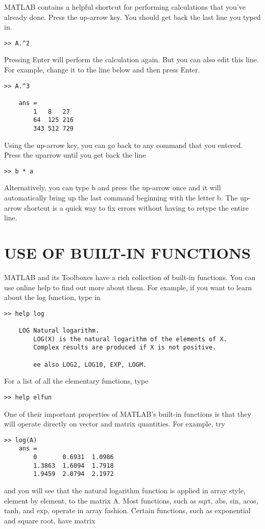 \documentclass[../main.tex]{subfiles}
\begin{document}
MATLAB contains a helpful shortcut for performing calculations that you’ve already
done. Press the up-arrow key. You should get back the last line you typed in.
\begin{lstlisting}[frame=none, numbers=none]
	>> A.^2
\end{lstlisting}
Pressing Enter will perform the calculation again. But you can also edit this line. For
example, change it to the line below and then press Enter.
\begin{lstlisting}[frame=none, numbers=none]
	>> A.^3

	ans =
		1 	8 	27
		64 	125	216
		343	512	729
\end{lstlisting}
Using the up-arrow key, you can go back to any command that you entered. Press the uparrow until you get back the line
\begin{lstlisting}[frame=none, numbers=none]
	>> b * a
\end{lstlisting}
Alternatively, you can type b and press the up-arrow once and it will automatically bring
up the last command beginning with the letter b. The up-arrow shortcut is a quick way to
fix errors without having to retype the entire line.


\section{USE OF BUILT-IN FUNCTIONS}

MATLAB and its Toolboxes have a rich collection of built-in functions. You can use online
help to find out more about them. For example, if you want to learn about the log function,
type in
\begin{lstlisting}[frame=none, numbers=none]
	>> help log

	LOG Natural logarithm.
		LOG(X) is the natural logarithm of the elements of X.
		Complex results are produced if X is not positive.

		ee also LOG2, LOG10, EXP, LOGM.
\end{lstlisting}
For a list of all the elementary functions, type
\begin{lstlisting}[frame=none, numbers=none]
	>> help elfun
\end{lstlisting}
One of their important properties of MATLAB’s built-in functions is that they will operate directly on vector and matrix quantities. For example, try
\begin{lstlisting}[frame=none, numbers=none]
	>> log(A)
	ans =
		0 		0.6931	1.0986
		1.3863 	1.6094	1.7918
		1.9459 	2.0794	2.1972
\end{lstlisting}
and you will see that the natural logarithm function is applied in array style, element by
element, to the matrix A. Most functions, such as sqrt, abs, sin, acos, tanh, and exp, operate 
in array fashion. Certain functions, such as exponential and square root, have matrix
\end{document}
